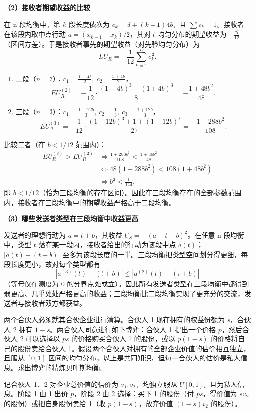 \textbf{（2）接收者期望收益的比较}

在 n 段均衡中，第 $k$ 段长度依次为 $c_k=d+(k-1)4b$，且 $\sum c_k=1$。接收者在该段内取中点行动 $a=(x_{k-1}+x_k)/2$，其对 $t$ 均匀分布的期望收益为 $-\frac{c_k^2}{12}$（区间方差）。于是接收者事先的期望收益（对先验均匀分布）为
\[
  EU_R=-\frac1{12}\sum_{k=1}^{n} c_k^{\,3}.
\]\indent
\begin{enumerate}[leftmargin=1.6em]
  \item 二段（$n=2$）：$c_1=\frac{1-4b}{2},\ c_2=\frac{1+4b}{2}$，
  \[
    EU_R^{(2)}=-\frac1{12}\cdot\frac{(1-4b)^3+(1+4b)^3}{8}
    =-\frac{1+48b^2}{48}.
  \]\indent
  \item 三段（$n=3$）：$c_1=\frac{1-12b}{3},\ c_2=\frac13,\ c_3=\frac{1+12b}{3}$，
  \[
    EU_R^{(3)}=-\frac1{12}\cdot\frac{(1-12b)^3+1+(1+12b)^3}{27}
    =-\frac{1+288b^2}{108}.
  \]\indent
\end{enumerate}
比较二者（在 $b<1/12$ 范围内）：
\[
\begin{aligned}
  EU_R^{(3)}>EU_R^{(2)}
  &\iff \frac{1+288b^2}{108}<\frac{1+48b^2}{48}\\
  &\iff 48(1+288b^2)<108(1+48b^2)\\
  &\iff b^2<\frac1{144},
\end{aligned}
\]\indent
即 $b<1/12$（恰为三段均衡的存在区间）。因此在三段均衡存在的全部参数范围内，接收者在三段均衡中的期望收益严格高于二段均衡。

\textbf{（3）哪些发送者类型在三段均衡中收益更高}

发送者的理想行动为 $a=t+b$，其收益 $U_S=-(a-t-b)^2$。在任意 n 段均衡中，类型 $t$ 落在某一段内，接收者给出的行动为该段中点 $a(t)$；$|a(t)-(t+b)|$ 至多为该段长度的一半。三段均衡把类型空间划分得更细，每段长度更小，故对每个类型都有
\[
  |a^{(3)}(t)-(t+b)|\le |a^{(2)}(t)-(t+b)|
\]\indent
（等号仅在测度为 $0$ 的分界点处成立）。因此所有发送者类型在三段均衡中都得到弱更高、几乎处处严格更高的收益；三段均衡比二段均衡实现了更充分的交流，发送者与接收者双方都获益。

两个合伙人必须就其合伙企业进行清算。合伙人 1 现在拥有的权益份额为 $s$，合伙人 2 拥有 $1-s$。两合伙人同意进行如下博弈：合伙人 1 提出一个价格 $p$，然后合伙人 2 可以选择以 $ps$ 的价格购买合伙人 1 的股份，或以 $p(1-s)$ 的价格将自己的股份卖给合伙人 1。假设两个合伙人对拥有的全部企业价值的估价相互独立，且服从 $[0,1]$ 区间的均匀分布，以上是共同知识。但每一合伙人的估价是私人信息。求出博弈的精炼贝叶斯均衡。

\sol 记合伙人 1、2 对企业总价值的估价为 $v_1,v_2$，均独立服从 $U[0,1]$，且为私人信息。阶段 1 由 1 出价 $p$，阶段 2 由 2 选择：买下 1 的股份（付 $ps$，得价值为 $s v_2$ 的股份）或把自身股份卖给 1（收 $p(1-s)$，放弃价值 $(1-s)v_2$ 的股份）。

